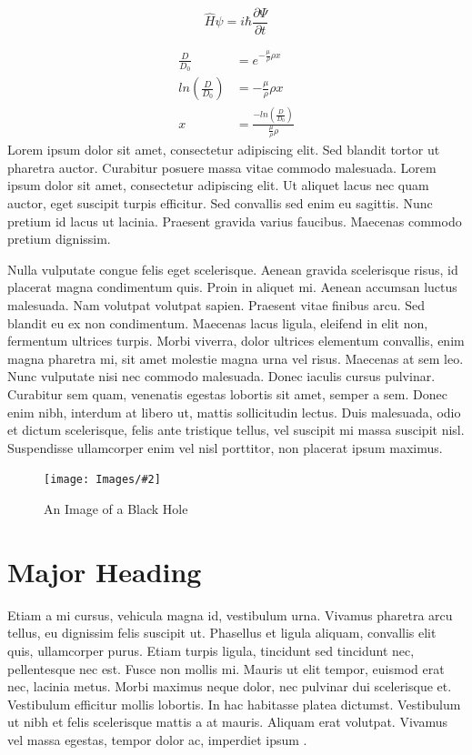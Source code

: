 \documentclass[12pt]{report}
\renewcommand{\cite}{\supercite}
\newcommand{\addimage}[4][0.8]{
    \begin{figure}[h]
        \centering
        \texttt{[image: Images/\#2]}
        \caption{#3}\label{fig:#4}
    \end{figure}
} %
\begin{document}
\begin{equation} %
     \hat{H} \psi = i \hbar \frac{\partial \Psi}{\partial t}
\end{equation}

\begin{align} %
     \frac{D}{D_0} &= e^{-\frac{\mu}{\rho}\rho x} \\
    ln\left(\frac{D}{D_0}\right) &= -\frac{\mu}{\rho}\rho x \\
    x &= \frac{-ln\left(\frac{D}{D_0}\right)}{\frac{\mu}{\rho}\rho}
\end{align}
Lorem ipsum dolor sit amet, consectetur adipiscing elit. Sed blandit tortor ut pharetra auctor. Curabitur posuere massa vitae commodo malesuada. Lorem ipsum dolor sit amet, consectetur adipiscing elit. Ut aliquet lacus nec quam auctor, eget suscipit turpis efficitur. Sed convallis sed enim eu sagittis. Nunc pretium id lacus ut lacinia. Praesent gravida varius faucibus. Maecenas commodo pretium dignissim.

Nulla vulputate congue felis eget scelerisque. Aenean gravida scelerisque risus, id placerat magna condimentum quis. Proin in aliquet mi. Aenean accumsan luctus malesuada. Nam volutpat volutpat sapien. Praesent vitae finibus arcu. Sed blandit eu ex non condimentum. Maecenas lacus ligula, eleifend in elit non, fermentum ultrices turpis. Morbi viverra, dolor ultrices elementum convallis, enim magna pharetra mi, sit amet molestie magna urna vel risus. Maecenas at sem leo. Nunc vulputate nisi nec commodo malesuada. Donec iaculis cursus pulvinar. Curabitur sem quam, venenatis egestas lobortis sit amet, semper a sem. Donec enim nibh, interdum at libero ut, mattis sollicitudin lectus. Duis malesuada, odio et dictum scelerisque, felis ante tristique tellus, vel suscipit mi massa suscipit nisl. Suspendisse ullamcorper enim vel nisl porttitor, non placerat ipsum maximus.

\addimage[0.7]{Black Hole Image.jpg}{An Image of a Black Hole\cite{hawking_particle_1993}}{black_hole}

\section{Major Heading}
Etiam a mi cursus, vehicula magna id, vestibulum urna. Vivamus pharetra arcu tellus, eu dignissim felis suscipit ut. Phasellus et ligula aliquam, convallis elit quis, ullamcorper purus. Etiam turpis ligula, tincidunt sed tincidunt nec, pellentesque nec est. Fusce non mollis mi. Mauris ut elit tempor, euismod erat nec, lacinia metus. Morbi maximus neque dolor, nec pulvinar dui scelerisque et. Vestibulum efficitur mollis lobortis. In hac habitasse platea dictumst. Vestibulum ut nibh et felis scelerisque mattis a at mauris. Aliquam erat volutpat. Vivamus vel massa egestas, tempor dolor ac, imperdiet ipsum \cite{rojas_engadget_2006}.
\end{document}
